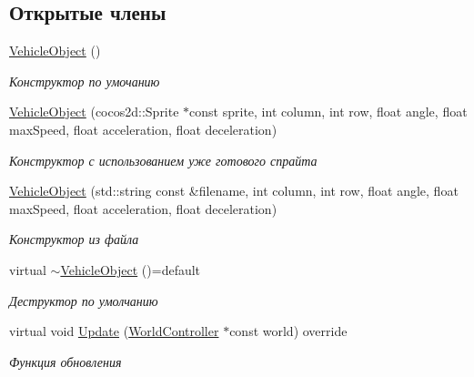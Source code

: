 \subsection*{Открытые члены}
\begin{DoxyCompactItemize}
\item 
\mbox{\label{classrtm_1_1_vehicle_object_a11e3aa43d731f461ed503fb26c48ea5c}} 
\hyperlink{classrtm_1_1_vehicle_object_a11e3aa43d731f461ed503fb26c48ea5c}{Vehicle\+Object} ()
\begin{DoxyCompactList}\small\item\em Конструктор по умочанию \end{DoxyCompactList}\item 
\hyperlink{classrtm_1_1_vehicle_object_aa14dd490d0828a12ab1e8f32bab4c98b}{Vehicle\+Object} (cocos2d\+::\+Sprite $\ast$const sprite, int column, int row, float angle, float max\+Speed, float acceleration, float deceleration)
\begin{DoxyCompactList}\small\item\em Конструктор с использованием уже готового спрайта \end{DoxyCompactList}\item 
\hyperlink{classrtm_1_1_vehicle_object_aee37c55d41eb445704b51f24cb7865cb}{Vehicle\+Object} (std\+::string const \&filename, int column, int row, float angle, float max\+Speed, float acceleration, float deceleration)
\begin{DoxyCompactList}\small\item\em Конструктор из файла \end{DoxyCompactList}\item 
\mbox{\label{classrtm_1_1_vehicle_object_a06fe20ebdc790885520022d7f59868c0}} 
virtual \hyperlink{classrtm_1_1_vehicle_object_a06fe20ebdc790885520022d7f59868c0}{$\sim$\+Vehicle\+Object} ()=default
\begin{DoxyCompactList}\small\item\em Деструктор по умолчанию \end{DoxyCompactList}\item 
virtual void \hyperlink{classrtm_1_1_vehicle_object_a1e089c8acf528660417a21c75658d546}{Update} (\hyperlink{classrtm_1_1_world_controller}{World\+Controller} $\ast$const world) override
\begin{DoxyCompactList}\small\item\em Функция обновления \end{DoxyCompactList}\end{DoxyCompactItemize}
